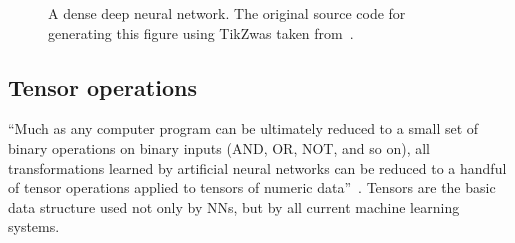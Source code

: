 \begin{figure}[!ht]
\centering
{}
\caption{A dense deep neural network. The original source code for generating
        this figure using TikZ\protect\footnotemark was taken from~\cite{neutelings_2022}.}
\label{fig:deep-neural-network}
\end{figure}


\subsection*{Tensor operations}
\label{tensor-operations}
``Much as any computer program can be ultimately reduced to a small set of binary
operations on binary inputs (AND, OR, NOT, and so on), all transformations learned
by artificial neural networks can be reduced to a handful of tensor operations applied
to tensors of numeric data''~\cite[p. 38]{Deep-learning-with-Python}. Tensors
are the basic data structure used not only by NNs,
but by all current machine learning systems.

